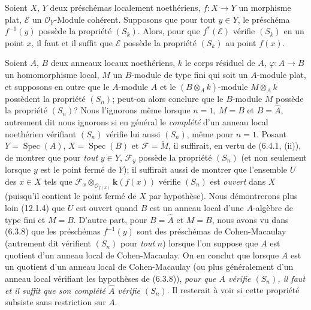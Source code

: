 \begin{corollary}[6.4.2]
\label{IV.2.s6.4.2-fr}
Soient $X$, $Y$ deux préschémas localement noethériens, $f:X\to Y$ un
morphisme plat, $\mathscr E$ un $\mathcal O_Y$-Module cohérent. Supposons que
pour tout $y\in Y$, le préschéma $f^{-1}(y)$ possède la propriété $(S_k)$.
Alors, pour que $f^*(\mathscr E)$ vérifie $(S_k)$ en un point $x$, il faut et
il suffit que $\mathscr E$ possède la propriété $(S_k)$ au point $f(x)$.
\end{corollary}

\begin{remark}[6.4.3]
\label{IV.2.s6.4.3-fr}
Soient $A$, $B$ deux anneaux locaux noethériens, $k$ le corps résiduel de
$A$, $\varphi:A\to B$ un homomorphisme local, $M$ un $B$-module de type fini
qui soit un $A$-module plat, et supposons en outre que le $A$-module $A$ et le
$(B\otimes_Ak)$-module $M\otimes_Ak$ possèdent la propriété $(S_n)$; peut-on
alors conclure que le $B$-module $M$ possède la propriété $(S_n)$? Nous
l'ignorons même lorsque $n=1$, $M=B$ et $B=\widehat A$, autrement dit nous
ignorons si en général le \emph{complété} d'un anneau local noethérien
vérifiant $(S_n)$ vérifie lui aussi $(S_n)$, même pour $n=1$. Posant
$Y=\operatorname{Spec}(A)$, $X=\operatorname{Spec}(B)$ et
$\mathscr F=\widetilde M$, il suffirait, en vertu de (6.4.1, (ii)), de montrer
que pour \emph{tout} $y\in Y$, $\mathscr F_y$ possède la propriété $(S_n)$
(et non seulement lorsque $y$ est le point fermé de $Y$); il suffirait aussi
de montrer que l'ensemble $U$ des $x\in X$ tels que
$\mathscr F_x\otimes_{\mathcal O_{f(x)}}\boldsymbol{k}(f(x))$ vérifie $(S_n)$ est \emph{ouvert}
dans $X$ (puisqu'il contient le point fermé de $X$ par hypothèse). Nous
démontrerons plus loin (12.1.4) que $U$ est ouvert quand $B$ est un anneau
local d'une $A$-algèbre de type fini et $M=B$. D'autre part, pour
$B=\widehat A$ et $M=B$, nous avons vu dans (6.3.8) que les préschémas
$f^{-1}(y)$ sont des préschémas de Cohen-Macaulay (autrement dit vérifient
$(S_n)$ pour \emph{tout} $n$) lorsque l'on suppose que $A$ est quotient d'un
anneau local de Cohen-Macaulay. On en conclut que lorsque $A$ est un quotient
d'un anneau local de Cohen-Macaulay (ou plus généralement d'un anneau local
vérifiant les hypothèses de (6.3.8)), \emph{pour que $A$ vérifie $(S_n)$, il
faut et il suffit que son complété $\widehat A$ vérifie $(S_n)$}. Il resterait
à voir si cette propriété subsiste sans restriction sur $A$.
\end{remark}


